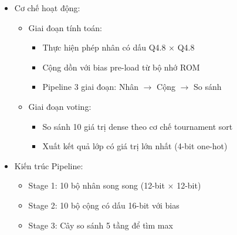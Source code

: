 \begin{itemize}
    \item Cơ chế hoạt động:
    \begin{itemize}
        \item Giai đoạn tính toán:
        \begin{itemize}
            \item Thực hiện phép nhân có dấu Q4.8 $\times$ Q4.8
            \item Cộng dồn với bias pre-load từ bộ nhớ ROM
            \item Pipeline 3 giai đoạn: Nhân $\rightarrow$ Cộng $\rightarrow$ So sánh
        \end{itemize}
        \item Giai đoạn voting:
        \begin{itemize}
            \item So sánh 10 giá trị dense theo cơ chế tournament sort
            \item Xuất kết quả lớp có giá trị lớn nhất (4-bit one-hot)
        \end{itemize}
    \end{itemize}
    
    \item Kiến trúc Pipeline:
    \begin{itemize}
        \item Stage 1: 10 bộ nhân song song (12-bit $\times$ 12-bit)
        \item Stage 2: 10 bộ cộng có dấu 16-bit với bias
        \item Stage 3: Cây so sánh 5 tầng để tìm max
    \end{itemize}
\end{itemize}

